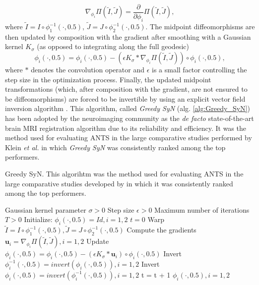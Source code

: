 \begin{equation}\label{eq:grad_metric}
    \nabla_{\phi_{i}} \Pi(\tilde{I}, \tilde{J}) = \frac{\partial}{\partial \phi_{i}} \Pi \left( \tilde{I}, \tilde{J}\right),
\end{equation}
where $\tilde{I} = I \circ \phi_{1}^{-1}(\cdot, 0.5)$, $\tilde{J} = J \circ \phi_{2}^{-1}(\cdot, 0.5)$. The midpoint diffeomorphisms are then updated by composition with the gradient after smoothing with a Gaussian kernel $K_{\sigma}$ (as opposed to integrating along the full geodesic)
\begin{equation}\label{eq:gsyn_update}
    \phi_{i}(\cdot, 0.5) = \phi_{i}(\cdot, 0.5) - \left( \epsilon K_{\sigma} \ast \nabla_{\phi_{i}} \Pi(\tilde{I}, \tilde{J}) \right) \circ \phi_{i}(\cdot, 0.5),
\end{equation}
where $\ast$ denotes the convolution operator and $\epsilon$ is a small factor controlling the step size in the optimization process. Finally, the updated midpoint transformations (which, after composition with the gradient, are not ensured to be diffeomorphisms) are forced to be invertible by using an explicit vector field inversion algorithm \citep{Chen2008}. This algorithm, called \textit{Greedy SyN} (alg. \ref{alg:Greedy_SyN}) has been adopted by the neuroimaging community as the \textit{de facto} state-of-the-art brain MRI registration algorithm due to its reliability and efficiency. It was the method used for evaluating ANTS \citep{Avants2011} in the large comparative studies performed by Klein {\it et al.} \cite{Klein2009, Klein2010} in which \textit{Greedy SyN} was consistently ranked among the top performers.

\begin{algorithm}[h!]
\caption{Greedy SyN. This algorihtm was the method used for evaluating ANTS \citep{Avants2011} in the large comparative studies developed by \cite{Klein2009, Klein2010} in which it was consistently ranked among the top performers.}\label{alg:Greedy_SyN}
\begin{algorithmic}[1]
\REQUIRE Gaussian kernel parameter $\sigma>0$
\REQUIRE Step size $\epsilon>0$
\REQUIRE Maximum number of iterations $T>0$
\STATE Initialize: $\phi_{i}(\cdot, 0.5) = Id, i=1, 2$
\STATE $t=0$
\REPEAT
    \STATE Warp $\tilde{I}  = I \circ \phi_{1}^{-1}(\cdot, 0.5), \tilde{J} = J \circ \phi_{2}^{-1}(\cdot, 0.5)$
    \STATE Compute the gradients $\mathbf{u}_{i} = \nabla_{\phi_{i}} \Pi(\tilde{I}, \tilde{J}), i=1,2$
    \STATE Update $\phi_{i}(\cdot, 0.5) = \phi_{i}(\cdot, 0.5) - \left( \epsilon K_{\sigma} \ast \mathbf{u}_{i} \right) \circ \phi_{i}(\cdot, 0.5)$
    \STATE Invert $\phi_{i}^{-1}(\cdot, 0.5) = invert (\phi_{i}(\cdot, 0.5)), i=1, 2$
    \STATE Invert $\phi_{i}(\cdot, 0.5) = invert (\phi_{i}^{-1}(\cdot, 0.5)), i=1, 2$
    \STATE t = t + 1
\RETURN $\phi_{i}(\cdot, 0.5), i=1,2$
\end{algorithmic}
\end{algorithm}
